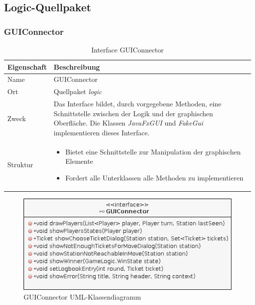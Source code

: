 \subsection{Logic-Quellpaket}
    \subsubsection{GUIConnector}
        \begin{table}[H]
            \caption{Interface GUIConnector}
            \begin{tabular}{p{2.5cm}  p{9.5cm}} 
                \hline
                \textbf{Eigenschaft} & \textbf{Beschreibung}\\
                \hline
                Name & GUIConnector\\
                Ort & Quellpaket \textit{logic}\\
                \hline
                Zweck &
                Das Interface bildet, durch vorgegebene Methoden, eine Schnittstelle zwischen der Logik und der graphischen Oberfläche.
                Die Klassen \textit{JavaFxGUI} und \textit{FakeGui} implementieren dieses Interface.
                \\
                \hline
                Struktur &
                \begin{itemize}
                    \itemsep0em
                    \item Bietet eine Schnittstelle zur Manipulation der graphischen Elemente
                    \item Fordert alle Unterklassen alle Methoden zu implementieren
                \end{itemize}
                \\
                \hline
            \end{tabular}
        \end{table}

        \begin{figure}[H]
            \centering
            \includegraphics[scale=0.7]{img/uml/guiConnector.png}   
            \caption{GUIConnector UML-Klassendiagramm}
        \end{figure}



